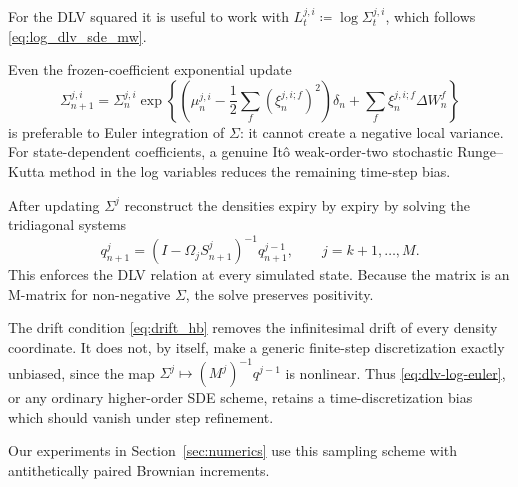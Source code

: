 \documentclass[11pt]{article}
\theoremstyle{plain}
\theoremstyle{definition}
\theoremstyle{remark}
\begin{document}
  For the DLV squared it is useful to work with
  $L_t^{j,i}\coloneqq\log\Sigma_t^{j,i}$, which follows \eqref{eq:log_dlv_sde_mw}. 

  Even the frozen-coefficient exponential update
  \begin{equation}
    \label{eq:dlv-log-euler}
    \Sigma_{n+1}^{j,i}
      =\Sigma_n^{j,i}\exp\!\left\{
        \left(\mu_n^{j,i}
          -\frac12\sum_f(\xi_n^{j,i;f})^2\right)\delta_n
        +\sum_f\xi_n^{j,i;f}\Delta W_n^f
      \right\}
  \end{equation}
  is preferable to Euler integration of $\Sigma$: it cannot create a negative
  local variance. For state-dependent coefficients, a genuine It\^o
  weak-order-two stochastic Runge--Kutta method in the log variables reduces
  the remaining time-step bias.

  After updating $\Sigma^{j}$ reconstruct the densities expiry by expiry by
  solving the tridiagonal systems
  \begin{equation}
    \label{eq:density-algebraic-step}
    q_{n+1}^{j}
      =\left(I-\Omega_jS_{n+1}^{j}\right)^{-1}q_{n+1}^{j-1},
    \qquad j=k+1,\ldots,M.
  \end{equation}
  This enforces the DLV relation at every simulated state. Because the matrix
  is an M-matrix for non-negative $\Sigma$, the solve preserves positivity.

  The drift condition \eqref{eq:drift_hb} removes the infinitesimal drift of
  every density coordinate. It does not, by itself, make a generic finite-step
  discretization exactly unbiased, since the map
  $\Sigma^j\mapsto(M^j)^{-1}q^{j-1}$ is nonlinear. Thus
  \eqref{eq:dlv-log-euler}, or any ordinary higher-order SDE scheme, retains a
  time-discretization bias which should vanish under step refinement.

  Our experiments in Section~\ref{sec:numerics} use this sampling scheme with antithetically paired Brownian increments.
\end{document}
